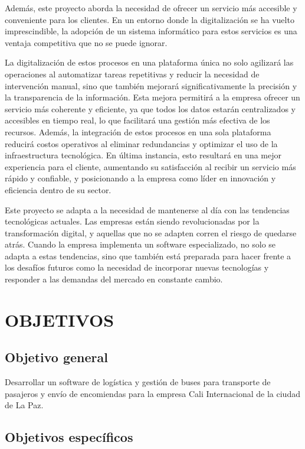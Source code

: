 	Además, este proyecto aborda la necesidad de ofrecer un servicio más accesible y conveniente para los clientes. En un entorno donde la digitalización se ha vuelto imprescindible, la adopción de un sistema informático para estos servicios es una ventaja competitiva que no se puede ignorar.
	
	La digitalización de estos procesos en una plataforma única no solo agilizará las operaciones al automatizar tareas repetitivas y reducir la necesidad de intervención manual, sino que también mejorará significativamente la precisión y la transparencia de la información. Esta mejora permitirá a la empresa ofrecer un servicio más coherente y eficiente, ya que todos los datos estarán centralizados y accesibles en tiempo real, lo que facilitará una gestión más efectiva de los recursos. Además, la integración de estos procesos en una sola plataforma reducirá costos operativos al eliminar redundancias y optimizar el uso de la infraestructura tecnológica. En última instancia, esto resultará en una mejor experiencia para el cliente, aumentando su satisfacción al recibir un servicio más rápido y confiable, y posicionando a la empresa como líder en innovación y eficiencia dentro de su sector.
	
	Este proyecto se adapta a la necesidad de mantenerse al día con las tendencias tecnológicas actuales. Las empresas están siendo revolucionadas por la transformación digital, y aquellas que no se adapten corren el riesgo de quedarse atrás. Cuando la empresa implementa un software especializado, no solo se adapta a estas tendencias, sino que también está preparada para hacer frente a los desafíos futuros como la necesidad de incorporar nuevas tecnologías y responder a las demandas del mercado en constante cambio.
	
\section{OBJETIVOS}
	\subsection{Objetivo general}
	
		Desarrollar un software de logística y gestión de buses para transporte de pasajeros y envío de encomiendas para la empresa Cali Internacional de la ciudad de La Paz.
		
	\subsection{Objetivos específicos}
	
